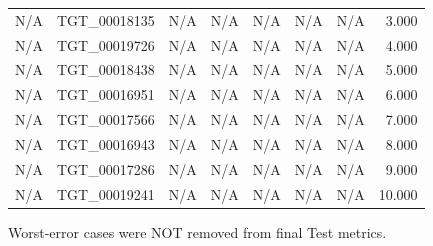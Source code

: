 \begin{table}[h!]
\begin{tabular}{lrrrrrrr}
N/A & TGT\_00018135 & N/A & N/A & N/A & N/A & N/A & 3.000 \\
N/A & TGT\_00019726 & N/A & N/A & N/A & N/A & N/A & 4.000 \\
N/A & TGT\_00018438 & N/A & N/A & N/A & N/A & N/A & 5.000 \\
N/A & TGT\_00016951 & N/A & N/A & N/A & N/A & N/A & 6.000 \\
N/A & TGT\_00017566 & N/A & N/A & N/A & N/A & N/A & 7.000 \\
N/A & TGT\_00016943 & N/A & N/A & N/A & N/A & N/A & 8.000 \\
N/A & TGT\_00017286 & N/A & N/A & N/A & N/A & N/A & 9.000 \\
N/A & TGT\_00019241 & N/A & N/A & N/A & N/A & N/A & 10.000 \\
\bottomrule
\end{tabular}
\vspace{4pt}
\footnotesize{Worst-error cases were NOT removed from final Test metrics.}\\
\end{table}
